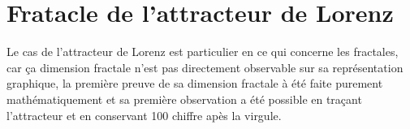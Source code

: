\section{Fratacle de l'attracteur de Lorenz}
Le cas de l'attracteur de Lorenz est particulier en ce qui concerne les fractales, car ça dimension fractale n'est pas directement observable sur sa représentation graphique, la première preuve de sa dimension fractale à été faite purement mathématiquement et sa première observation a été possible en traçant l'attracteur et en conservant 100 chiffre apès la virgule.